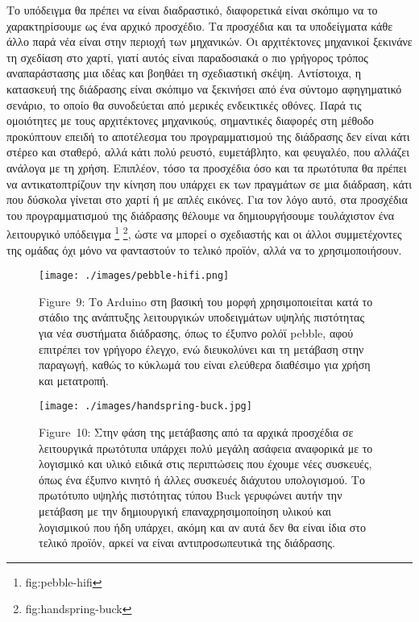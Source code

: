 \documentclass[
]{article}
\begin{document}
Το υπόδειγμα θα πρέπει να είναι διαδραστικό, διαφορετικά είναι σκόπιμο
να το χαρακτηρίσουμε ως ένα αρχικό προσχέδιο. Τα προσχέδια και τα
υποδείγματα κάθε άλλο παρά νέα είναι στην περιοχή των μηχανικών. Οι
αρχιτέκτονες μηχανικοί ξεκινάνε τη σχεδίαση στο χαρτί, γιατί αυτός είναι
παραδοσιακά ο πιο γρήγορος τρόπος αναπαράστασης μια ιδέας και βοηθάει τη
σχεδιαστική σκέψη. Αντίστοιχα, η κατασκευή της διάδρασης είναι σκόπιμο
να ξεκινήσει από ένα σύντομο αφηγηματικό σενάριο, το οποίο θα
συνοδεύεται από μερικές ενδεικτικές οθόνες. Παρά τις ομοιότητες με τους
αρχιτέκτονες μηχανικούς, σημαντικές διαφορές στη μέθοδο προκύπτουν
επειδή το αποτέλεσμα του προγραμματισμού της διάδρασης δεν είναι κάτι
στέρεο και σταθερό, αλλά κάτι πολύ ρευστό, ευμετάβλητο, και φευγαλέο,
που αλλάζει ανάλογα με τη χρήση. Επιπλέον, τόσο τα προσχέδια όσο και τα
πρωτότυπα θα πρέπει να αντικατοπτρίζουν την κίνηση που υπάρχει εκ των
πραγμάτων σε μια διάδραση, κάτι που δύσκολα γίνεται στο χαρτί ή με απλές
εικόνες. Για τον λόγο αυτό, στα προσχέδια του προγραμματισμού της
διάδρασης θέλουμε να δημιουργήσουμε τουλάχιστον ένα λειτουργικό
υπόδειγμα \footnote{fig:pebble-hifi} \footnote{fig:handspring-buck},
ώστε να μπορεί ο σχεδιαστής και οι άλλοι συμμετέχοντες της ομάδας όχι
μόνο να φανταστούν το τελικό προϊόν, αλλά να το χρησιμοποιήσουν.

\leavevmode{}%
\begin{figure}
\hypertarget{fig:pebble-hifi}{%
\centering
\texttt{[image: ./images/pebble-hifi.png]}
\caption{Figure~9: Το Arduino στη βασική του μορφή χρησιμοποιείται κατά
το στάδιο της ανάπτυξης λειτουργικών υποδειγμάτων υψηλής πιστότητας για
νέα συστήματα διάδρασης, όπως το έξυπνο ρολόϊ pebble, αφού επιτρέπει τον
γρήγορο έλεγχο, ενώ διευκολύνει και τη μετάβαση στην παραγωγή, καθώς το
κύκλωμά του είναι ελεύθερα διαθέσιμο για χρήση και
μετατροπή.}\label{fig:pebble-hifi}
}
\end{figure}

\leavevmode{}%
\begin{figure}
\hypertarget{fig:handspring-buck}{%
\centering
\texttt{[image: ./images/handspring-buck.jpg]}
\caption{Figure~10: Στην φάση της μετάβασης από τα αρχικά προσχέδια σε
λειτουργικά πρωτότυπα υπάρχει πολύ μεγάλη ασάφεια αναφορικά με το
λογισμικό και υλικό ειδικά στις περιπτώσεις που έχουμε νέες συσκευές,
όπως ένα έξυπνο κινητό ή άλλες συσκευές διάχυτου υπολογισμού. Το
πρωτότυπο υψηλής πιστότητας τύπου Buck γερυφώνει αυτήν την μετάβαση με
την δημιουργική επαναχρησιμοποίηση υλικού και λογισμικού που ήδη
υπάρχει, ακόμη και αν αυτά δεν θα είναι ίδια στο τελικό προϊόν, αρκεί να
είναι αντιπροσωπευτικά της διάδρασης.}\label{fig:handspring-buck}
}
\end{figure}
\end{document}
